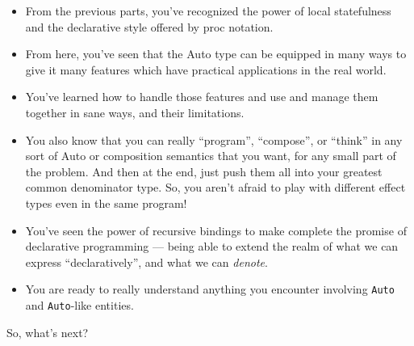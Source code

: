 \documentclass[]{article}
\begin{document}
\begin{itemize}
\item
  From the previous parts, you've recognized the power of local
  statefulness and the declarative style offered by proc notation.
\item
  From here, you've seen that the Auto type can be equipped in many ways
  to give it many features which have practical applications in the real
  world.
\item
  You've learned how to handle those features and use and manage them
  together in sane ways, and their limitations.
\item
  You also know that you can really ``program'', ``compose'', or
  ``think'' in any sort of Auto or composition semantics that you want,
  for any small part of the problem. And then at the end, just push them
  all into your greatest common denominator type. So, you aren't afraid
  to play with different effect types even in the same program!
\item
  You've seen the power of recursive bindings to make complete the
  promise of declarative programming --- being able to extend the realm
  of what we can express ``declaratively'', and what we can
  \emph{denote}.
\item
  You are ready to really understand anything you encounter involving
  \texttt{Auto} and \texttt{Auto}-like entities.
\end{itemize}

So, what's next?
\end{document}
